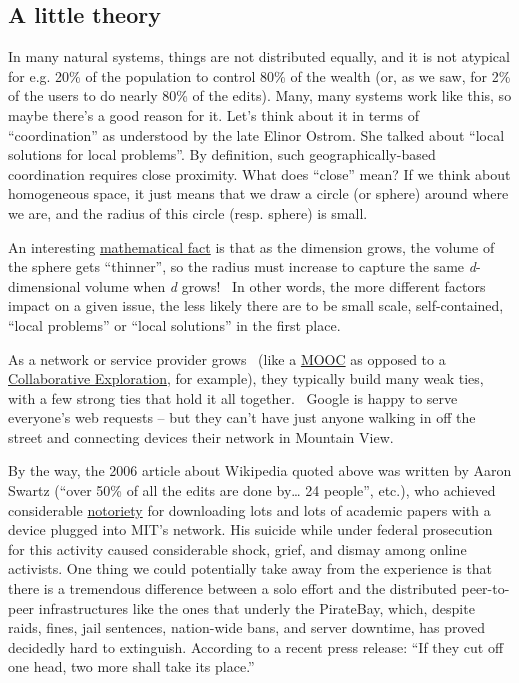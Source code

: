 \subsection{A little theory}

In many natural systems, things are not distributed equally, and it is
not atypical for e.g. 20\% of the population to control 80\% of the
wealth (or, as we saw, for 2\% of the users to do nearly 80\% of the
edits). Many, many systems work like this, so maybe there's a good
reason for it.
Let's think about it in terms of ``coordination'' as understood by the
late Elinor Ostrom. She talked about ``local solutions for local
problems''. By definition, such geographically-based coordination
requires close proximity. What does ``close'' mean? If we think about
homogeneous space, it just means that we draw a circle (or sphere)
around where we are, and the radius of this circle (resp. sphere) is
small.

An interesting
\href{http://en.wikipedia.org/wiki/N-sphere\#Volume_and_surface_area}{mathematical
fact} is that as the dimension grows, the volume of the sphere gets
``thinner'', so the radius must increase to capture the same
\emph{d}-dimensional volume when \emph{d} grows! ~In other words, the
more different factors impact on a given issue, the less likely there
are to be small scale, self-contained, ``local problems'' or ``local
solutions'' in the first place.

As a network or service provider grows~ (like a
\href{http://peeragogy.org/organize/connectivism-in-practice-how-to-organize-a-mooc/}{MOOC}
as opposed to a
\href{http://peeragogy.org/case-study-collaborative-explorations/}{Collaborative
Exploration}, for example), they typically build many weak ties, with a
few strong ties that hold it all together.~ Google is happy to serve
everyone's web requests -- but they can't have just anyone walking in
off the street and connecting devices their network in Mountain View.

By the way, the 2006 article about Wikipedia quoted above was written
by Aaron Swartz (``over 50\% of all the edits are done by\ldots{} 24
people'', etc.), who achieved considerable
\href{http://www.wired.com/threatlevel/2011/07/swartz-arrest/}{notoriety}
for downloading lots and lots of academic papers with a device plugged
into MIT's network.  His suicide while under federal prosecution for
this activity caused considerable shock, grief, and dismay among online
activists.  One thing we could potentially take away from the experience is that
there is a tremendous difference between a solo effort and the
distributed peer-to-peer infrastructures like the ones that underly
the PirateBay, which, despite raids, fines, jail sentences,
nation-wide bans, and server downtime, has proved decidedly hard to
extinguish.  According to a recent press release: ``If they cut off
one head, two more shall take its place.''


